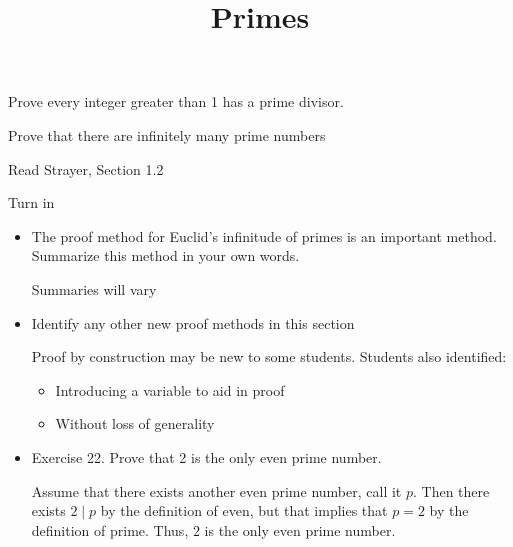 \documentclass{ximera}
\title{Primes}
\begin{document}
\begin{abstract}
\end{abstract}
\maketitle


\begin{obj}
\item  Prove every integer greater than 1 has a prime divisor.
\item  Prove that there are infinitely many prime numbers
\end{obj}


\begin{instructorNotes}

\begin{pre}
 \item[Read] Strayer, Section 1.2
 \item[Turn in] 
\begin{itemize}
 \item The proof method for Euclid's infinitude of primes is an important method. Summarize this method in your own words.
 
\begin{solution}
 Summaries will vary
\end{solution}
 \item Identify any other new proof methods in this section
 
\begin{solution}
 Proof by construction may be new to some students. Students also identified: 
\begin{itemize}
 \item Introducing a variable to aid in proof
 \item Without loss of generality
 
\end{itemize}
\end{solution}
 \item Exercise 22. Prove that 2 is the only even prime number.
 
\begin{solution}
 Assume that there exists another even prime number, call it $p$. Then there exists $2\mid p$ by the definition of even, but that implies that $p=2$ by the definition of prime. Thus, $2$ is the only even prime number.
\end{solution}
\end{itemize}
\end{pre}
  
\end{instructorNotes}
\end{document}
